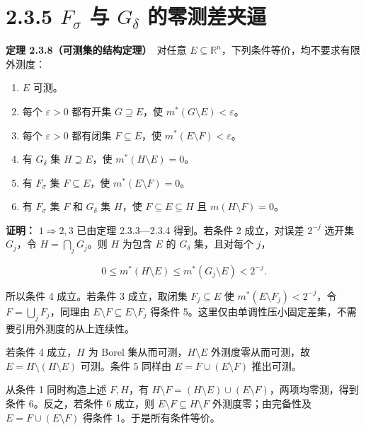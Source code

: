 \documentclass[11pt,a4paper]{article}
\providecommand{\tightlist}{\setlength{\itemsep}{3pt}\setlength{\parskip}{0pt}}
\begin{document}
\section[\S{}2.3.5 \texorpdfstring{$F_\sigma$}{Fσ} 与 \texorpdfstring{$G_\delta$}{Gδ}
的零测差夹逼]{2.3.5 \texorpdfstring{$F_\sigma$}{Fσ} 与 \texorpdfstring{$G_\delta$}{Gδ}
的零测差夹逼}\label{fux3c3-ux4e0e-gux3b4-ux7684ux96f6ux6d4bux5deeux5939ux903c}

\textbf{定理 2.3.8（可测集的结构定理）}　对任意
\(E\subseteq\mathbb R^n\)，下列条件等价，均不要求有限外测度：

\begin{enumerate}
\def\labelenumi{\arabic{enumi}.}
\tightlist
\item
  \(E\) 可测。
\item
  每个 \(\varepsilon>0\) 都有开集 \(G\supseteq E\)，使
  \(m^*(G\setminus E)<\varepsilon\)。
\item
  每个 \(\varepsilon>0\) 都有闭集 \(F\subseteq E\)，使
  \(m^*(E\setminus F)<\varepsilon\)。
\item
  有 \(G_\delta\) 集 \(H\supseteq E\)，使 \(m^*(H\setminus E)=0\)。
\item
  有 \(F_\sigma\) 集 \(F\subseteq E\)，使 \(m^*(E\setminus F)=0\)。
\item
  有 \(F_\sigma\) 集 \(F\) 和 \(G_\delta\) 集 \(H\)，使
  \(F\subseteq E\subseteq H\) 且 \(m(H\setminus F)=0\)。
\end{enumerate}

\textbf{证明：} \(1\Rightarrow2,3\) 已由定理 2.3.3---2.3.4 得到。若条件
2 成立，对误差 \(2^{-j}\) 选开集 \(G_j\)，令 \(H=\bigcap_jG_j\)。则
\(H\) 为包含 \(E\) 的 \(G_\delta\) 集，且对每个 \(j\)，

\begin{equation*}
0\le m^*(H\setminus E)\le m^*(G_j\setminus E)<2^{-j}.
\tag{2.3.10}
\end{equation*}

所以条件 4 成立。若条件 3 成立，取闭集 \(F_j\subseteq E\) 使
\(m^*(E\setminus F_j)<2^{-j}\)，令 \(F=\bigcup_jF_j\)，同理由
\(E\setminus F\subseteq E\setminus F_j\) 得条件
5。这里仅由单调性压小固定差集，不需要引用外测度的从上连续性。

若条件 4 成立，\(H\) 为 Borel 集从而可测，\(H\setminus E\)
外测度零从而可测，故 \(E=H\setminus(H\setminus E)\) 可测。条件 5 同样由
\(E=F\cup(E\setminus F)\) 推出可测。

从条件 1 同时构造上述 \(F,H\)，有
\(H\setminus F=(H\setminus E)\cup(E\setminus F)\)，两项均零测，得到条件
6。反之，若条件 6 成立，则 \(E\setminus F\subseteq H\setminus F\)
外测度零；由完备性及 \(E=F\cup(E\setminus F)\) 得条件
1。于是所有条件等价。
\end{document}
